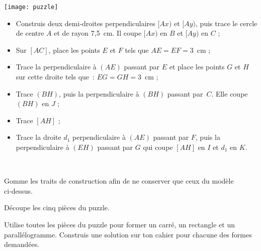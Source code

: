 \begin{activite}

\begin{partie}

\begin{minipage}[c]{0.3\linewidth}
\texttt{[image: puzzle]}
\end{minipage} \hfill%
\begin{minipage}[c]{0.56\linewidth}
 
  \begin{itemize}
   \item Construis deux demi‑droites perpendiculaires $[Ax)$ et $[Ay)$, puis trace le cercle de centre $A$ et de rayon 7,5 cm. Il coupe $[Ax)$ en $B$ et $[Ay)$ en $C$ ;
   \item Sur $[AC]$, place les points $E$ et $F$ tels que $AE = EF = 3$ cm ;
   \item Trace la perpendiculaire à $(AE)$ passant par $E$ et place les points $G$ et $H$ sur cette droite tels que : $EG = GH = 3$ cm ;
   \item Trace $(BH)$, puis la perpendiculaire à $(BH)$ passant par $C$. Elle coupe $(BH)$ en $J$ ;
   \item Trace $[AH]$ ;
   \item Trace la droite $d_1$ perpendiculaire à $(AE)$ passant par $F$, puis la perpendiculaire à $(EH)$ passant par $G$ qui coupe $[AH]$ en $I$ et $d_1$ en $K$.
   \end{itemize}

\end{minipage} \\

 \end{partie}

Gomme les traits de construction afin de ne conserver que ceux du modèle ci‑dessus.
   
Découpe les cinq pièces du puzzle. 

\begin{partie}
Utilise toutes les pièces du puzzle pour former un carré, un rectangle et un parallélogramme. Construis une solution sur ton cahier pour chacune des formes demandées.
 \end{partie}
 
\end{activite}
